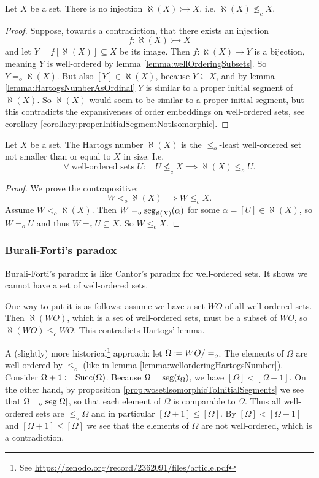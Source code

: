 \begin{theorem} \label{theorem:HartogsLemma}
Let $X$ be a set. There is no injection $\aleph(X) \rightarrowtail X$, i.e. $\aleph(X) \nleq_c X$.
\end{theorem}
\begin{proof}
Suppose, towards a contradiction, that there exists an injection
\[ f: \aleph(X) \rightarrowtail X \]
and let $Y = f[\aleph(X)] \subseteq X$ be its image. Then $f: \aleph(X) \to Y$ is a bijection, meaning $Y$ is well-ordered by lemma \ref{lemma:wellOrderingSubsets}. So $Y =_o \aleph(X)$.
But also $[Y]\in \aleph(X)$, because $Y\subseteq X$, and by lemma \ref{lemma:HartogsNumberAsOrdinal} $Y$ is similar to a proper initial segment of $\aleph(X)$.
So $\aleph(X)$ would seem to be similar to a proper initial segment, but this contradicts the expansiveness of order embeddings on well-ordered sets, see corollary \ref{corollary:properInitialSegmentNotIsomorphic}.
\end{proof}


\begin{proposition} \label{proposition:HartogsLeast}
Let $X$ be a set. The Hartogs number $\aleph(X)$ is the $\leq_o$-least well-ordered set not smaller than or equal to $X$ in size. I.e.
\[ \forall \;\text{well-ordered sets $U$}:\quad U \nleq_c X \implies \aleph(X)\leq_o U. \]
\end{proposition}
\begin{proof}
We prove the contrapositive:
\[ W <_o \aleph(X) \implies W \leq_c X. \]
Assume $W <_o \aleph(X)$. Then $W =_o \operatorname{seg}_{\aleph(X)}(\alpha)$ for some $\alpha = [U]\in \aleph(X)$, so $W=_o U$ and thus $W =_c U \subseteq X$. So $W\leq_c X$.
\end{proof}

\subsubsection{Burali-Forti's paradox}
Burali-Forti's paradox is like Cantor's paradox for well-ordered sets. It shows we cannot have a set of well-ordered sets.

One way to put it is as follows: assume we have a set $WO$ of all well ordered sets. Then $\aleph(WO)$, which is a set of well-ordered sets, must be a subset of $WO$, so $\aleph(WO) \leq_c WO$. This contradicts Hartogs' lemma.

A (slightly) more historical\footnote{See \url{https://zenodo.org/record/2362091/files/article.pdf}} approach: let $\Omega \coloneqq WO/=_o$.
The elements of $\Omega$ are well-ordered by $\leq_o$ (like in lemma \ref{lemma:wellorderingHartogsNumber}).
Consider $\Omega+1 \coloneqq \operatorname{Succ}(\Omega)$. Because $\Omega = \operatorname{seg}(t_\Omega)$, we have $[\Omega] < [\Omega +1]$.
On the other hand, by proposition \ref{prop:wosetIsomorphicToInitialSegments} we see that $\Omega =_o \operatorname{seg}[\Omega]$, so that each element of $\Omega$ is comparable to $\Omega$.
Thus all well-ordered sets are $\leq_o \Omega$ and in particular $[\Omega + 1] \leq [\Omega]$. By $[\Omega] < [\Omega +1]$ and $[\Omega + 1] \leq [\Omega]$ we see that the elements of $\Omega$ are not well-ordered, which is a contradiction.

